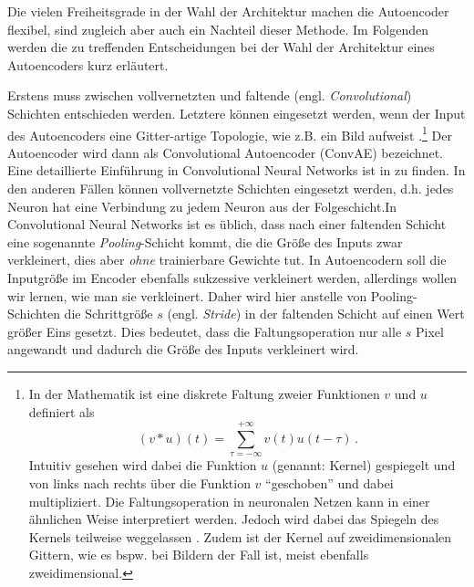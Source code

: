 Die vielen Freiheitsgrade in der Wahl der Architektur machen die Autoencoder flexibel, sind
zugleich aber auch ein Nachteil dieser Methode. Im Folgenden werden die zu treffenden
Entscheidungen bei der Wahl der Architektur eines Autoencoders kurz erläutert.

Erstens muss zwischen vollvernetzten und faltende (engl. \textit{Convolutional}) Schichten
entschieden werden. Letztere können eingesetzt werden, wenn der Input des Autoencoders eine
Gitter-artige Topologie, wie z.B. ein Bild aufweist \parencite[330]{Goodfellow.2016}.\footnote{In der Mathematik ist eine diskrete Faltung zweier
	Funktionen $v$ und $u$ definiert als
	\begin{equation*}
		(v * u)(t) = \sum_{\tau = -\infty}^{+\infty} v(t)u(t - \tau) \, .
	\end{equation*}
	Intuitiv gesehen wird dabei die Funktion $u$ (genannt: Kernel) gespiegelt und von links nach rechts über die Funktion $v$ \enquote{geschoben} und dabei multipliziert. Die Faltungsoperation in neuronalen Netzen kann in einer ähnlichen Weise interpretiert werden. Jedoch wird dabei das Spiegeln des Kernels teilweise weggelassen \parencite[333]{Goodfellow.2016}. Zudem ist der Kernel auf zweidimensionalen Gittern, wie es bspw. bei
	Bildern der Fall ist, meist ebenfalls zweidimensional.} Der Autoencoder wird dann als Convolutional
Autoencoder (ConvAE) bezeichnet. Eine detaillierte Einführung in Convolutional Neural Networks ist
in \textcite[330 -- 372]{Goodfellow.2016} zu finden. In den anderen Fällen können vollvernetzte
Schichten eingesetzt werden, d.h. jedes Neuron hat eine Verbindung zu jedem Neuron aus der
Folgeschicht.In Convolutional Neural Networks ist es üblich, dass nach einer faltenden Schicht eine
sogenannte \textit{Pooling}-Schicht \parencite[339 -- 345]{Goodfellow.2016} kommt, die die Größe des Inputs zwar verkleinert, dies aber
\textit{ohne} trainierbare Gewichte tut. In Autoencodern soll die Inputgröße im Encoder ebenfalls
sukzessive verkleinert werden, allerdings wollen wir lernen, wie man sie verkleinert. Daher wird
hier anstelle von Pooling-Schichten die Schrittgröße $s$ (engl. \textit{Stride}) in der faltenden
Schicht auf einen Wert größer Eins gesetzt. Dies bedeutet, dass die Faltungsoperation nur alle $s$
Pixel angewandt und dadurch die Größe des Inputs verkleinert wird.

